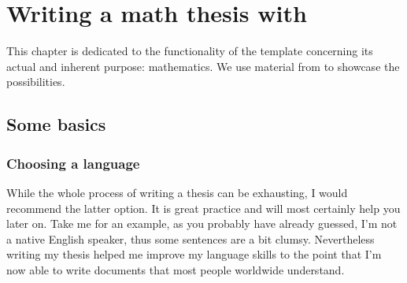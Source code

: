 \chapter{Writing a math thesis with \texttt{\classname}}\label{ch:math}
This chapter is dedicated to the functionality of the template concerning its actual and 
inherent purpose: mathematics. We use material from \cite{Evans15} to showcase 
the possibilities.
\section{Some basics}
\subsection{Choosing a language}
While the whole process 
of writing a thesis can be exhausting, I would recommend the latter option. It is great 
practice and will most certainly help you later on. Take me for an example, as you 
probably have already guessed, I'm not a native English speaker, thus some sentences 
are a bit clumsy. Nevertheless writing my thesis helped me improve my language skills 
to the point that I'm now able to write documents that most people worldwide understand.
